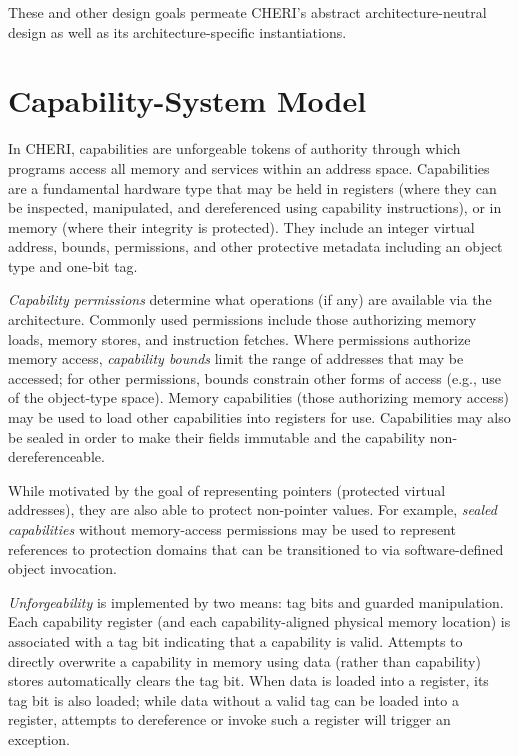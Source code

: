 These and other design goals permeate CHERI's abstract architecture-neutral
design as well as its architecture-specific instantiations.

\section{Capability-System Model}

In CHERI, capabilities are unforgeable tokens of authority through which
programs access all memory and services within an address space.
Capabilities are a fundamental hardware type that may be held in registers
(where they can be inspected, manipulated, and dereferenced using capability
instructions), or in memory (where their integrity is protected).
They include an integer virtual address, bounds, permissions, and other
protective metadata including an object type and one-bit tag.

\textit{Capability permissions} determine what operations (if any) are
available via the architecture.
Commonly used permissions include those authorizing memory loads, memory
stores, and instruction fetches.
Where permissions authorize memory access, \textit{capability bounds} limit
the range of addresses that may be accessed; for other permissions, bounds
constrain other forms of access (e.g., use of the object-type space).
Memory capabilities (those authorizing memory access) may be used to load
other capabilities into registers for use.
Capabilities may also be sealed in order to make their fields immutable and
the capability non-dereferenceable.

While motivated by the goal of representing pointers (protected virtual
addresses), they are also able to protect non-pointer values.
For example, \textit{sealed capabilities} without memory-access permissions
may be used to represent references to protection domains that can be
transitioned to via software-defined object invocation.

\textit{Unforgeability} is implemented by two means: tag bits and guarded
manipulation.
Each capability register (and each capability-aligned physical memory
location) is associated with a tag bit indicating that a capability is valid.
Attempts to directly overwrite a capability in memory using data (rather than
capability) stores automatically clears the tag bit.
When data is loaded into a register, its tag bit is also loaded; while data
without a valid tag can be loaded into a register, attempts to dereference or
invoke such a register will trigger an exception.


